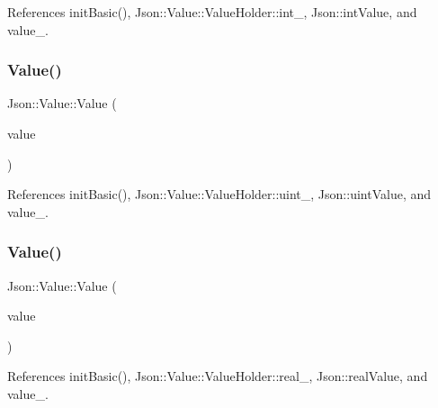References init\+Basic(), Json\+::\+Value\+::\+Value\+Holder\+::int\+\_\+, Json\+::int\+Value, and value\+\_\+.

\mbox{\label{classJson_1_1Value_a8adda58d5ae17bf7ca6a53bab4a7b69c_a8adda58d5ae17bf7ca6a53bab4a7b69c}} 
\subsubsection{\texorpdfstring{Value()}{Value()}\hspace{0.1cm}{\footnotesize\ttfamily [5/12]}}
{\footnotesize\ttfamily Json\+::\+Value\+::\+Value (\begin{DoxyParamCaption}\item[{\hyperlink{classJson_1_1Value_a8b62564be8c087c6d18de180ff4e13e3_a8b62564be8c087c6d18de180ff4e13e3}{U\+Int64}}]{value }\end{DoxyParamCaption})}



References init\+Basic(), Json\+::\+Value\+::\+Value\+Holder\+::uint\+\_\+, Json\+::uint\+Value, and value\+\_\+.

\mbox{\label{classJson_1_1Value_a32228cc84d83200cca8441451997996c_a32228cc84d83200cca8441451997996c}} 
\subsubsection{\texorpdfstring{Value()}{Value()}\hspace{0.1cm}{\footnotesize\ttfamily [6/12]}}
{\footnotesize\ttfamily Json\+::\+Value\+::\+Value (\begin{DoxyParamCaption}\item[{double}]{value }\end{DoxyParamCaption})}



References init\+Basic(), Json\+::\+Value\+::\+Value\+Holder\+::real\+\_\+, Json\+::real\+Value, and value\+\_\+.

\mbox{\label{classJson_1_1Value_ad87b849356816aca75995dd07302e49d_ad87b849356816aca75995dd07302e49d}} 
